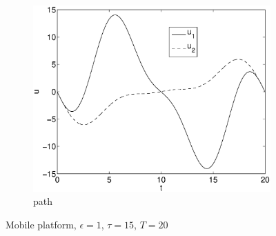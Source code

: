 \begin{figure}[h]
\begin{subfigure}[b]{\textwidth}
\centering
\includegraphics[height=0.3\textheight]{img/final_1_15_20_u.eps}
\caption{path}
\end{subfigure}
\caption{Mobile platform, $\epsilon=1$, $\tau=15$, $T=20$}
\label{fig:pl6}
\end{figure}

